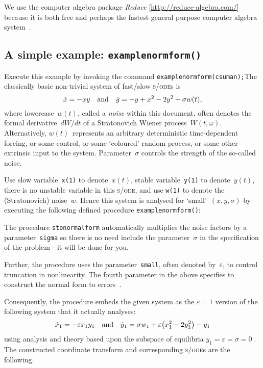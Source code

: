 \documentclass[11pt,a5paper]{article}
\def\eps{\ensuremath{\varepsilon}}
\def\sde{\textsc{s/ode}}
\begin{document}
We use the computer algebra package \emph{Reduce} 
[\url{http://reduce-algebra.com/}] because it is both free 
and perhaps the fastest general purpose computer algebra 
system~\cite[e.g.]{Fateman2002}.



\subsection{A simple example: \texttt{examplenormform()}} 
\label{ss:eg}
Execute this example by invoking the command
\verb|examplenormform(csuman);|\quad The classically basic
non-trivial system of fast/slow \sde{}s
\cite[\S19.1]{Roberts2014a} is
\begin{equation*}
\dot x=-xy \quad\mbox{and}\quad \dot y=-y+x^2-2y^2+\sigma w(t),
\end{equation*}
where lowercase~$w(t)$, called a \emph{noise} within this
document, often denotes the formal derivative~$dW/dt$ of a
Stratonovich Wiener process~$W(t,\omega)$. Alternatively,
\(w(t)\)~represents an arbitrary deterministic
time-dependent forcing, or some control, or some `coloured'
random process, or some other extrinsic input to the system.
Parameter~$\sigma$ controls the strength of the so-called
noise.

Use slow variable~\verb|x(1)| to denote~$x(t)$, stable
variable~\verb|y(1)| to denote~$y(t)$, there is no unstable
variable in this \sde, and use \verb|w(1)| to denote the
(Stratonovich) noise~$w$.  Hence this system is analysed for
`small'~\((x,y,\sigma)\) by executing the following defined
procedure \verb|examplenormform()|:
The procedure \verb|stonormalform| automatically multiplies
the noise factors by a parameter~\verb|sigma| so there is no
need include the parameter~$\sigma$ in the specification of
the problem---it will be done for you.

Further, the procedure uses the parameter~\verb|small|, often
denoted by~\(\eps\), to control truncation in nonlinearity. 
The fourth parameter in the above specifies to construct the
normal form to errors~\Ord{\eps^3}.

Consequently, the procedure embeds the given system as the
\(\eps=1\) version of the following system that it actually
analyses:
\begin{equation*}
\dot x_{1}=-\eps x_{1} y_{1} 
\qtq{and} 
\dot y_{1}=\sigma  w_{1}+\eps \big(x_{1}^{2}-2
y_{1}^{2}\big)-y_{1}
\end{equation*}
using analysis and theory based upon the subspace of
equilibria \(y_1=\eps=\sigma=0\)\,.  The constructed
coordinate transform and corresponding \sde{}s are the
following.
\end{document}
